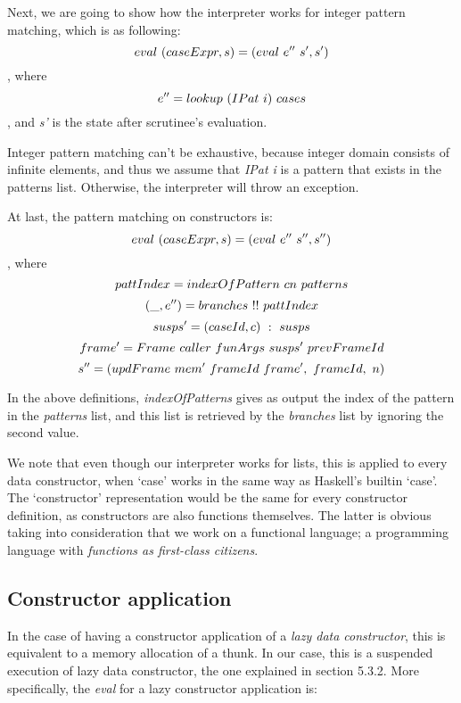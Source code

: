 \documentclass[diploma]{softlab-thesis}
\begin{document}
Next, we are going to show how the interpreter works for integer pattern matching, which is as following:
\[eval \hfill\ (caseExpr, s) = (eval \hfill\ e'' \hfill\ s', s') \]
, where 
\[e'' = lookup \hfill\ (IPat \hfill\ i) \hfill\ cases \]
, and \textit{s'} is the state after scrutinee's evaluation.
\newline
\par Integer pattern matching can't be exhaustive, because integer domain consists of infinite elements, and thus we 
assume that \textit{IPat i} is a pattern that exists in the patterns list. Otherwise, the interpreter will throw an exception.
\newline
\par At last, the pattern matching on constructors is:
\[eval \hfill\ (caseExpr, s) = (eval \hfill\ e'' \hfill\ s'', s'') \], where
\[pattIndex = indexOfPattern \hfill\ cn \hfill\ patterns \]
\[(\_, e'') = branches \hfill\ !! \hfill\ pattIndex \]
\[susps' = (caseId, c) \hfill\ : \hfill\ susps \]
\[frame' = Frame \hfill\ caller \hfill\ funArgs \hfill\ susps' \hfill\ prevFrameId \]
\[s'' = (updFrame \hfill\ mem' \hfill\ frameId \hfill\ frame', \hfill\ frameId, \hfill\ n) \]
\newline
\par In the above definitions, \textit{indexOfPatterns} gives as output the index of the pattern in the \textit{patterns} list, 
and this list is retrieved by the \textit{branches} list by ignoring the second value.
\newline
\par We note that even though our interpreter works for lists, this is applied to every data constructor, when `case' works 
in the same way as Haskell's builtin `case'. The `constructor' representation would be the same for every constructor definition, 
as constructors are also functions themselves. The latter is obvious taking into consideration that we work on a functional language; 
a programming language with \textit{functions as first-class citizens}.

\subsection{Constructor application}

In the case of having a constructor application of a \textit{lazy data constructor},
this is equivalent to a memory allocation of a thunk. In our case, this is 
a suspended execution of lazy data constructor, the one explained in section 5.3.2.
More specifically, the \textit{eval} for a lazy constructor application is:
\end{document}
